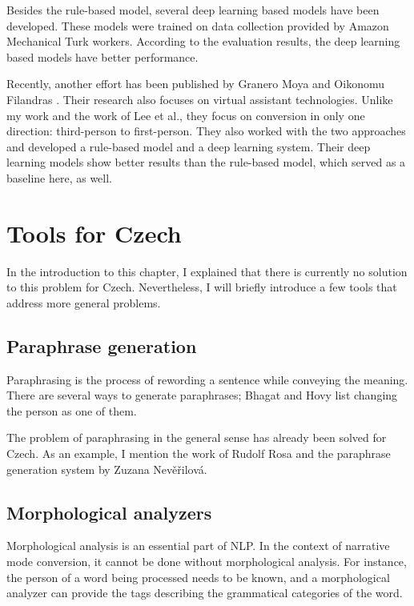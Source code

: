 Besides the rule-based model, several deep learning based models have been developed. These models were trained on data collection provided by Amazon Mechanical Turk workers. According to the evaluation results, the deep learning based models have better performance.

Recently, another effort has been published by Granero Moya and Oikonomu Filandras \cite{granero-moya-oikonomou-filandras-2021-taking}. Their research also focuses on virtual assistant technologies. Unlike my work and the work of Lee et al., they focus on conversion in only one direction: third-person to first-person. They also worked with the two approaches and developed a rule-based model and a deep learning system. Their deep learning models show better results than the rule-based model, which served as a baseline here, as well.

\section{Tools for Czech}

In the introduction to this chapter, I explained that there is currently no solution to this problem for Czech. Nevertheless, I will briefly introduce a few tools that address more general problems.

\subsection{Paraphrase generation}

Paraphrasing is the process of rewording a sentence while conveying the meaning. There are several ways to generate paraphrases; Bhagat and Hovy \cite{bhagat-hovy-2013-squibs} list changing the person as one of them.

The problem of paraphrasing in the general sense has already been solved for Czech. As an example, I mention the work of Rudolf Rosa and the paraphrase generation system by Zuzana Nevěřilová. \cite{Neverilova2014thesis}

\subsection{Morphological analyzers}

Morphological analysis is an essential part of NLP. In the context of narrative mode conversion, it cannot be done without morphological analysis. For instance, the person of a word being processed needs to be known, and a morphological analyzer can provide the tags describing the grammatical categories of the word.

